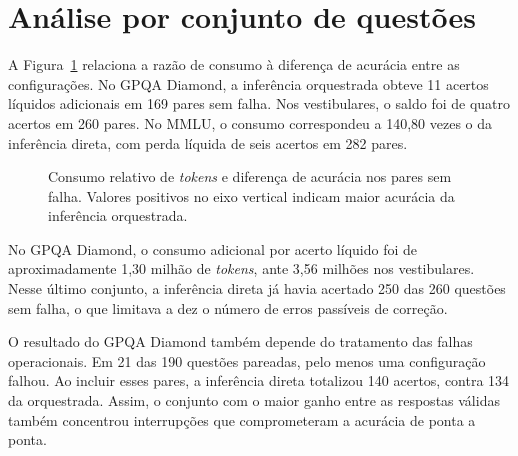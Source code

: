 \documentclass[a4paper,10pt, twocolumn]{article}
\begin{document}
\section{Análise por conjunto de questões}

A Figura~\ref{fig:custo} relaciona a razão de consumo à diferença de acurácia entre as configurações. No GPQA Diamond, a inferência orquestrada obteve 11 acertos líquidos adicionais em 169 pares sem falha. Nos vestibulares, o saldo foi de quatro acertos em 260 pares. No MMLU, o consumo correspondeu a 140,80 vezes o da inferência direta, com perda líquida de seis acertos em 282 pares.

\newpage

\begin{figure}[H]
\centering
{}
\caption{Consumo relativo de \textit{tokens} e diferença de acurácia nos pares sem falha. Valores positivos no eixo vertical indicam maior acurácia da inferência orquestrada.}\label{fig:custo}
\end{figure}

No GPQA Diamond, o consumo adicional por acerto líquido foi de aproximadamente 1,30 milhão de \textit{tokens}, ante 3,56 milhões nos vestibulares. Nesse último conjunto, a inferência direta já havia acertado 250 das 260 questões sem falha, o que limitava a dez o número de erros passíveis de correção.

O resultado do GPQA Diamond também depende do tratamento das falhas operacionais. Em 21 das 190 questões pareadas, pelo menos uma configuração falhou. Ao incluir esses pares, a inferência direta totalizou 140 acertos, contra 134 da orquestrada. Assim, o conjunto com o maior ganho entre as respostas válidas também concentrou interrupções que comprometeram a acurácia de ponta a ponta.
\end{document}
